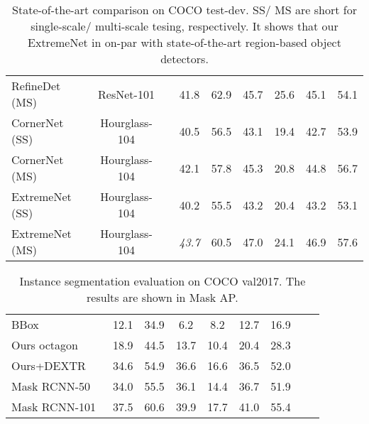 \documentclass[10pt,twocolumn,letterpaper]{article}
\begin{document}
\begin{table*}
\begin{center}
\begin{tabular}{l@{\ \ }c@{\ \ \ \ \ }c@{\ \ \ \ \ }c@{\ }c@{\ }c@{\ \ \ \ \ }c@{\ }c@{\ }c}
        RefineDet (MS)~\cite{zhang2018single} & ResNet-101 &  &
        41.8 & 62.9 & 45.7 & 25.6 & 45.1 & 54.1\\
        CornerNet (SS)~\cite{Law_2018_ECCV} & Hourglass-104 &  & 40.5 & 56.5 & 43.1 &
        19.4 & 42.7 & 53.9 \\
        CornerNet (MS)~\cite{Law_2018_ECCV} & Hourglass-104 &  & 42.1 & 57.8 & 45.3 &
        20.8 & 44.8 & 56.7\\
ExtremeNet (SS)  & Hourglass-104 &  & 40.2 & 55.5 & 43.2 & 20.4 & 43.2 & 53.1 \\
ExtremeNet (MS)  & Hourglass-104 &  & \emph{43.7} & 60.5 & 47.0 & 24.1 & 46.9 & 57.6 \\
\bottomrule
\end{tabular}
\caption{State-of-the-art comparison on COCO test-dev. SS/ MS are short for single-scale/ multi-scale tesing, respectively. It shows that our ExtremeNet in on-par with state-of-the-art region-based object detectors.}
\label{table:main}
\end{center}
\end{table*}
\setlength{\tabcolsep}{1.4pt}

\setlength{\tabcolsep}{2pt}
\begin{table}[b]
\vspace{-1.5em}
\begin{center}
\begin{tabular}{lcccccccc}
\toprule
 &   &  &  &  &  & \\
\midrule
BBox  & 12.1 & 34.9 & 6.2 & 8.2 & 12.7 & 16.9\\
Ours octagon& 18.9 & 44.5 & 13.7 & 10.4 & 20.4 & 28.3 \\
Ours+DEXTR~\cite{Man+18} & 34.6 & 54.9 & 36.6 & 16.6 & 36.5 & 52.0 \\ 
\midrule
Mask RCNN-50~\cite{he2017mask} & 34.0 & 55.5 & 36.1 & 14.4 & 36.7 & 51.9 \\
Mask RCNN-101~\cite{he2017mask} & 37.5 & 60.6 & 39.9 & 17.7 & 41.0 & 55.4 \\
\bottomrule
\end{tabular}
\caption{Instance segmentation evaluation on COCO val2017. The results are shown in Mask AP.}
\label{table:seg}
\end{center}
\vspace{-0.5em}
\end{table}
\setlength{\tabcolsep}{1.4pt}
\end{document}
